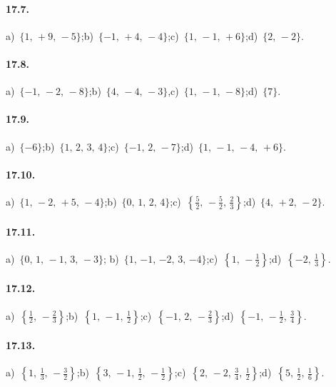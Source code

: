 \paragraph{17.7.}
a)~$\{1\text{,~}+9\text{,~}-5\}$;\quad b)~$\{-1\text{,~}+4\text{,~}-4\}$;\quad c)~$\{1\text{,~}-1\text{,~}+6\}$;\quad d)~$\{2\text{,~}-2\}$.
\paragraph{17.8.}
a)~$\{-1\text{,~}-2\text{,~}-8\}$;\quad b)~$\{4\text{,~}-4\text{,~}-3\}$,\quad c)~$\{1\text{,~}-1\text{,~}-8\}$;\quad d)~$\{7\}$.
\paragraph{17.9.}
a)~$\{-6\}$;\quad b)~$\{1\text{,~}2\text{,~}3\text{,~}4\}$;\quad c)~$\{-1\text{,~}2\text{,~}-7\}$;\quad d)~$\{1\text{,~}-1\text{,~}-4\text{,~}+6\}$.

\paragraph{17.10.}
a)~$\{1\text{,~}-2\text{,~}+5\text{,~}-4\}$;\quad b)~$\{0\text{,~}1\text{,~}2\text{,~}4\}$;\quad c)~$\left\{\frac{5}{2}\text{,~}-\frac{5}{2}\text{,~}\frac{2}{3}\right\}$;\quad d)~$\{4\text{,~}+2\text{,~}-2\}$.

\paragraph{17.11.}
a)~$\{0\text{,~}1\text{,~}-1\text{,~}3\text{,~}-3\}$;\quad
b)~$\{1\text{,~}{-1}\text{,~}{-2}\text{,~}3\text{,~}{-4}\}$;\quad c)~$\left\{1\text{,~}-\frac{1}{2}\right\}$;\quad d)~$\left\{-2\text{,~}\frac{1}{3}\right\}$.

\paragraph{17.12.}
a)~$\left\{\frac{1}{2}\text{,~}-\frac{2}{3}\right\}$;\quad b)~$\left\{1\text{,~}-1\text{,~}\frac{1}{2}\right\}$;\quad c)~$\left\{-1\text{,~}2\text{,~}-\frac{2}{3}\right\}$;\quad d)~$\left\{-1\text{,~}-\frac{1}{2}\text{,~}\frac{3}{4}\right\}$.

\paragraph{17.13.}
a)~$\left\{1\text{,~}\frac{1}{3}\text{,~}-\frac{3}{2}\right\}$;\quad b)~$\left\{3\text{,~}-1\text{,~}\frac{1}{2}\text{,~}-\frac{1}{2}\right\}$;\quad c)~$\left\{2\text{,~}-2\text{,~}\frac{3}{4}\text{,~}\frac{1}{2}\right\}$;\quad d)~$\left\{5\text{,~}\frac{1}{2}\text{,~}\frac{1}{6}\right\}$.

